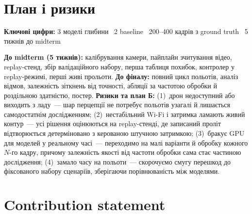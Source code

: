 \documentclass[ukrainian]{ucuproposal}
\begin{document}
\section{План і ризики}
\begin{keyfacts}
\textbf{Ключові цифри:} 3 моделі глибини \textperiodcentered\ 2 baseline
\textperiodcentered\ 200--400 кадрів з ground truth \textperiodcentered\ 5 тижнів до midterm
\end{keyfacts}
\textbf{До midterm (5 тижнів):} калібрування камери, пайплайн зчитування
відео, replay-стенд, збір валідаційного набору, перша таблиця похибок,
контролер у replay-режимі, перші живі прольоти. \textbf{До фіналу:}
повний цикл польотів, аналіз відмов, залежність зіткнень від точності,
абляції за частотою обробки й роздільною здатністю, постер.
\textbf{Ризики та план Б:} (1)~дрон недоступний або виходить з ладу~---
шар перцепції не потребує польотів узагалі й лишається самодостатнім
дослідженням; (2)~нестабільний Wi-Fi і затримка ламають живий контур~---
усі рішення оцінюються на replay-стенді, де записаний проліт
відтворюється детерміновано з керованою штучною затримкою;
(3)~бракує GPU для моделей у реальному часі~--- переходимо на малі
варіанти й обробку кожного \(N\)-го кадру, причому залежність якості від
частоти обробки сама стає частиною дослідження; (4)~замало часу на
польоти~--- скорочуємо смугу перешкод до фіксованого набору сценаріїв,
зберігаючи порівнюваність між моделями.

\section{Contribution statement}
\begin{contributions}
\end{contributions}

\ucuprintbibliography
\end{document}
